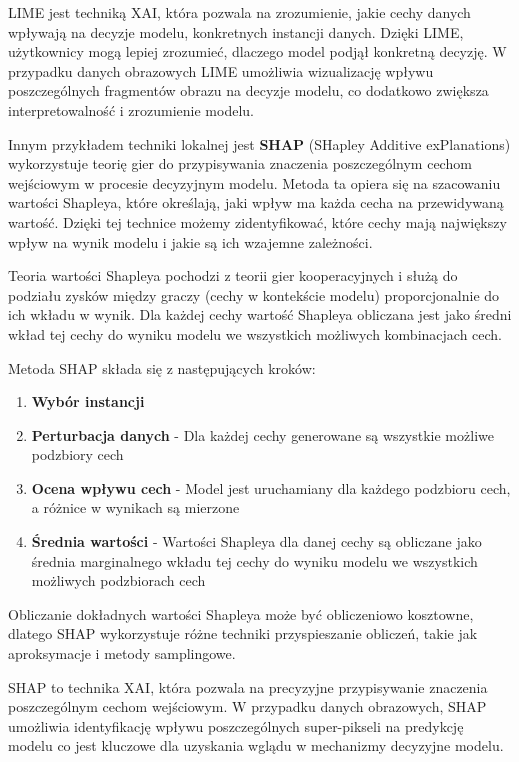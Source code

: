 LIME jest techniką XAI, która pozwala na zrozumienie, jakie cechy danych wpływają na decyzje modelu, konkretnych instancji danych.
Dzięki LIME, użytkownicy mogą lepiej zrozumieć, dlaczego model podjął konkretną decyzję.
W przypadku danych obrazowych LIME umożliwia wizualizację wpływu poszczególnych fragmentów obrazu na decyzje modelu, co dodatkowo zwiększa interpretowalność i zrozumienie modelu.

Innym przykładem techniki lokalnej jest \textbf{SHAP} (SHapley Additive exPlanations)\cite{lundberg2017unified, SHAPmanip} wykorzystuje teorię gier do przypisywania znaczenia poszczególnym cechom wejściowym w procesie decyzyjnym modelu.
Metoda ta opiera się na szacowaniu wartości Shapleya, które określają, jaki wpływ ma każda cecha na przewidywaną wartość.
Dzięki tej technice możemy zidentyfikować, które cechy mają największy wpływ na wynik modelu i jakie są ich wzajemne zależności.

Teoria wartości Shapleya pochodzi z teorii gier kooperacyjnych i służą do podziału zysków między graczy (cechy w kontekście modelu) proporcjonalnie do ich wkładu w wynik.
Dla każdej cechy wartość Shapleya obliczana jest jako średni wkład tej cechy do wyniku modelu we wszystkich możliwych kombinacjach cech.

Metoda SHAP składa się z następujących kroków:
\begin{enumerate}
	\item \textbf{Wybór instancji}
	\item \textbf{Perturbacja danych} - Dla każdej cechy generowane są wszystkie możliwe podzbiory cech
	\item \textbf{Ocena wpływu cech} - Model jest uruchamiany dla każdego podzbioru cech, a różnice w wynikach są mierzone
	\item \textbf{Średnia wartości} - Wartości Shapleya dla danej cechy są obliczane jako średnia marginalnego wkładu tej cechy do wyniku modelu we wszystkich możliwych podzbiorach cech
\end{enumerate}

Obliczanie dokładnych wartości Shapleya może być obliczeniowo kosztowne, dlatego SHAP wykorzystuje różne techniki przyspieszanie obliczeń, takie jak aproksymacje i metody samplingowe.

SHAP to technika XAI, która pozwala na precyzyjne przypisywanie znaczenia poszczególnym cechom wejściowym.
W przypadku danych obrazowych, SHAP umożliwia identyfikację wpływu poszczególnych super-pikseli na predykcję modelu co jest kluczowe dla uzyskania wglądu w mechanizmy decyzyjne modelu.

